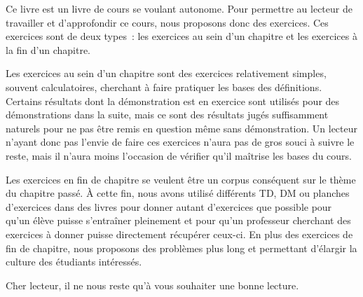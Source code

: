 Ce livre est un livre de cours se voulant autonome. Pour permettre au lecteur de
travailler et d'approfondir ce cours, nous proposons donc des exercices. Ces
exercices sont de deux types~: les exercices au sein d'un chapitre et les
exercices à la fin d'un chapitre.

Les exercices au sein d'un chapitre sont des exercices relativement simples,
souvent calculatoires, cherchant à faire pratiquer les bases des définitions.
Certains résultats dont la démonstration est en exercice sont utilisés pour des
démonstrations dans la suite, mais ce sont des résultats jugés suffisamment
naturels pour ne pas être remis en question même sans démonstration. Un lecteur
n'ayant donc pas l'envie de faire ces exercices n'aura pas de gros souci à
suivre le reste, mais il n'aura moins l'occasion de vérifier qu'il maîtrise les
bases du cours.

Les exercices en fin de chapitre se veulent être un corpus conséquent sur le
thème du chapitre passé. \`A cette fin, nous avons utilisé différents TD, DM ou
planches d'exercices dans des livres pour donner autant d'exercices que possible
pour qu'un élève puisse s'entraîner pleinement et pour qu'un professeur
cherchant des exercices à donner puisse directement récupérer ceux-ci. En plus
des exercices de fin de chapitre, nous proposons des problèmes plus long et
permettant d'élargir la culture des étudiants intéressés.

Cher lecteur, il ne nous reste qu'à vous souhaiter une bonne lecture.
